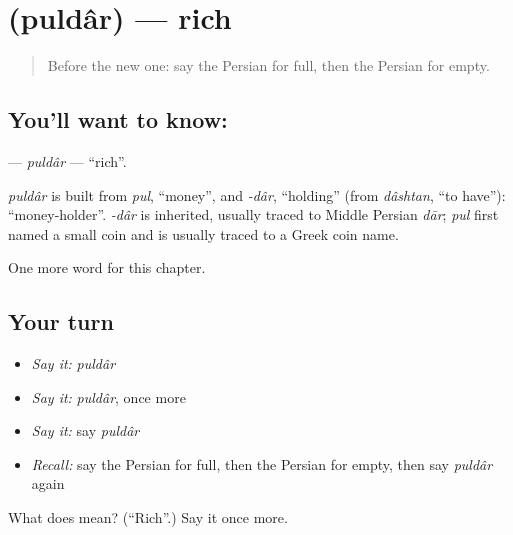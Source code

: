 \section[\texorpdfstring{\fa{پولدار} (puldâr)}{پولدار (puldâr)}]{ (puldâr) — rich}

\label{lesson:FA-C61-puldar}



\begin{quote}
Before the new one: say the Persian for full, then the Persian for empty.
\end{quote}

\subsection*{You'll want to know: }
\textbf{} — \emph{puldâr} — \textquotedblleft{}rich\textquotedblright{}.

\begin{cousinweb}
\emph{puldâr} is built from \emph{pul}, \textquotedblleft{}money\textquotedblright{}, and \emph{-dâr}, \textquotedblleft{}holding\textquotedblright{} (from \emph{dâshtan}, \textquotedblleft{}to have\textquotedblright{}): \textquotedblleft{}money-holder\textquotedblright{}. \emph{-dâr} is inherited, usually traced to Middle Persian \emph{dār}; \emph{pul} first named a small coin and is usually traced to a Greek coin name.
\end{cousinweb}

\begin{grammarlens}[title={What you've built}]
One more word for this chapter.
\end{grammarlens}

\subsection*{Your turn}
\begin{itemize}
\raggedright
  \item \emph{Say it:} \emph{puldâr}
  \item \emph{Say it:} \emph{puldâr}, once more
  \item \emph{Say it:} say \emph{puldâr}
  \item \emph{Recall:} say the Persian for full, then the Persian for empty, then say \emph{puldâr} again
\end{itemize}

\begin{tcolorbox}[breakable,colback=teal!4,colframe=teal!35!black,title={Before you move on}]
What does  mean? (\textquotedblleft{}Rich\textquotedblright{}.) Say it once more.
\end{tcolorbox}
